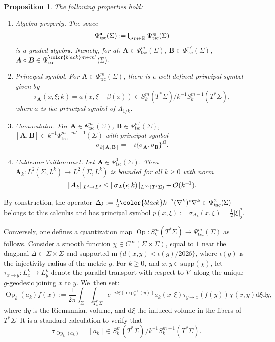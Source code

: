 \documentclass[10pt]{amsart}
\newcommand{\sbullet}{{\scriptscriptstyle\bullet}}
\newcommand{\csbullet}{{\raisebox{1pt}{$\sbullet$}}}
\newcommand{\bA}{\boldsymbol{A}}
\newcommand{\bB}{\boldsymbol{B}}
\theoremstyle{plain}
\newtheorem{proposition}[theorem]{Proposition}
\theoremstyle{definition}
\let\mc\mathcal
\newcommand{\R}{\mathbb{R}}
\newcommand{\dd}{\mathrm{d}}
\DeclareMathOperator{\Op}{Op}
\begin{document}
\begin{proposition}
The following properties hold:

\begin{enumerate}

\item \emph{Algebra property.} The space
\[\textstyle
\Psi^\csbullet_{\mathrm{tsc}}(\Sigma) := \bigcup_{m \in \R} \Psi^m_{\mathrm{tsc}}(\Sigma)
\]
is a graded algebra. Namely, for all $\bA\in\Psi^m_{\mathrm{tsc}}(\Sigma)$, $\bB\in\Psi^{m'}_{\mathrm{tsc}}(\Sigma)$, $\bA \circ \bB \in \Psi^{\color{black}m+m'}_{\mathrm{tsc}}(\Sigma)$.

\item \emph{Principal symbol.} For $\bA \in \Psi^m_{\mathrm{tsc}}(\Sigma)$, there is a well-defined principal symbol given by
\[
\sigma_{\bA}(x,\xi ; k) = a(x,\xi + \beta(x)) \in
S^m_{k}(T^*\Sigma)/k^{-1}S^{m-1}_{k}(T^*\Sigma),
\]
where $a$ is the principal symbol of $A_{1/k}$.

\item \emph{Commutator.} For $\bA \in \Psi^m_{\mathrm{tsc}}(\Sigma)$, $\bB \in \Psi^{m'}_{\mathrm{tsc}}(\Sigma)$, $[\bA,\bB] \in k^{-1}\Psi^{m+m'-1}_{\mathrm{tsc}}(\Sigma)$ with principal symbol
\[
\sigma_{k[\bA,\bB]} = -i \{\sigma_{\bA},\sigma_{\bB}\}^\Omega.
\]

\item \emph{Calderon-Vaillancourt.} Let $\bA \in \Psi^0_{\mathrm{tsc}}(\Sigma)$. Then $\bA_k : L^2(\Sigma,L^k) \to L^2(\Sigma,L^k)$ is bounded for all $k \geq 0$ with norm
\[
\|\bA_k\|_{L^2 \to L^2} \leq \|\sigma_{\bA}(\csbullet;k)\|_{L^\infty(T^*\Sigma)} + \mc{O}(k^{-1}).
\]

\end{enumerate}

\end{proposition}

By construction, the operator $\Delta_k := \tfrac{1}{2} {\color{black}k^{-2}} (\nabla^k)^*\nabla^k \in \Psi^2_{\mathrm{tsc}}(\Sigma)$ belongs to this calculus and has principal symbol $p(x,\xi) := \sigma_{\Delta_k}(x,\xi) = \tfrac{1}{2}|\xi|^2_g$.

Conversely, one defines a quantization map $\Op : S^m_{k}(T^*\Sigma) \to \Psi^m_{\mathrm{tsc}}(\Sigma)$ as follows. Consider a smooth function $\chi \in C^\infty(\Sigma \times \Sigma)$, equal to $1$ near the diagonal $\Delta \subset \Sigma \times \Sigma$ and supported in $\{d(x,y) < \iota(g)/2026\}$, where $\iota(g)$ is the injectivity radius of the metric $g$. For $k \geq 0$, and $x,y \in \mathrm{supp}(\chi)$, let $\tau_{x \to y} : L^k_x \to L^k_y$ denote the parallel transport with respect to $\nabla$ along the unique $g$-geodesic joining $x$ to $y$. We~then set:
\[
\Op_{k}(a_{k}) f(x) := \dfrac{1}{2\pi} \int_{\Sigma} \int_{T^*_x\Sigma} e^{-ik\xi(\exp^{-1}_x(y))} a_{k}(x,\xi) \tau_{y \to x}(f(y)) \chi(x,y) \dd\xi \dd y,
\]
where $\dd y$ is the Riemannian volume, and $\dd\xi$ the induced volume in the fibers of $T^*\Sigma$. It is a standard calculation to verify that
\[
\sigma_{\Op_{k}(a_{k})} = [a_{k}] \in S^m_{k}(T^*\Sigma)/k^{-1}S^{m-1}_{k}(T^*\Sigma).
\]
\end{document}
